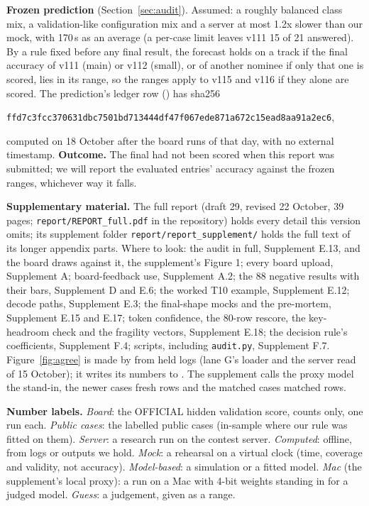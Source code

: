 \documentclass{article}
\begin{document}
\textbf{Frozen prediction} (Section~\ref{sec:audit}). Assumed: a roughly balanced class mix, a validation-like
configuration mix and a server at most 1.2x slower than our mock, with 170\,s as an average (a per-case limit leaves
v111 15 of 21 answered). By a rule fixed before any final result, the forecast holds on a track if the final accuracy
of v111 (main) or v112 (small), or of another nominee if only that one is scored, lies in its range, so the ranges
apply to v115 and v116 if they alone are scored. The prediction's ledger row
() has sha256
\begin{center}
\small\texttt{ffd7c3fcc370631dbc7501bd713444df47f067ede871a672c15ead8aa91a2ec6},
\end{center}
computed on 18 October after the board runs of that day, with no external timestamp. \textbf{Outcome.} The final had
not been scored when this report was submitted; we will report the evaluated entries' accuracy against the frozen
ranges, whichever way it falls.

\textbf{Supplementary material.} The full report (draft 29, revised 22 October, 39 pages;
\texttt{report/REPORT\_full.pdf} in the repository) holds every detail this version omits; its supplement folder
\texttt{report/report\_supplement/} holds the full text of its longer appendix parts. Where to look: the audit in full,
Supplement E.13, and the board draws against it, the supplement's Figure 1; every board upload, Supplement A;
board-feedback use, Supplement A.2; the 88 negative results with their bars, Supplement D and E.6; the worked T10
example, Supplement E.12; decode paths, Supplement E.3; the final-shape mocks and the pre-mortem, Supplement E.15 and
E.17; token confidence, the 80-row rescore, the key-headroom check and the fragility vectors, Supplement E.18; the
decision rule's coefficients, Supplement F.4; scripts, including \texttt{audit.py}, Supplement F.7.
Figure~\ref{fig:agree} is made by  from held logs (lane G's loader
and the server read of 15 October); it writes its numbers to . The
supplement calls the proxy model the stand-in, the newer cases fresh rows and the matched cases matched rows.

\textbf{Number labels.} \emph{Board}: the OFFICIAL hidden validation score, counts only, one run each. \emph{Public
cases}: the labelled public cases (in-sample where our rule was fitted on them). \emph{Server}: a research run on the
contest server. \emph{Computed}: offline, from logs or outputs we hold. \emph{Mock}: a rehearsal on a virtual clock
(time, coverage and validity, not accuracy). \emph{Model-based}: a simulation or a fitted model. \emph{Mac} (the supplement's local
proxy): a run on a Mac with 4-bit weights standing in for a judged model. \emph{Guess}: a judgement, given as a range.
\end{document}
